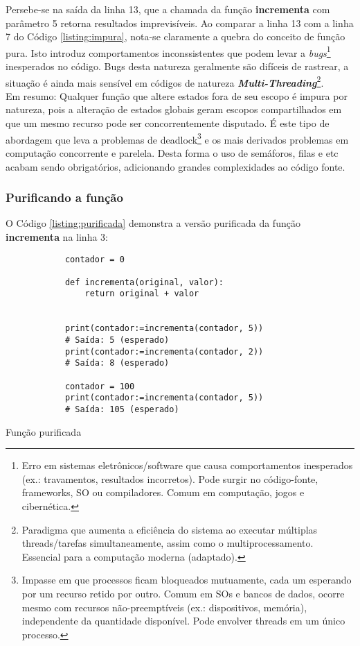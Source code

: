 \documentclass[date,twocolumn,a4paper]{ppgem}
\begin{document}
        Persebe-se na saída da linha 13, que a chamada da função \textbf{incrementa} com parâmetro 5 retorna resultados imprevisíveis. Ao comparar
        a linha 13 com a linha 7 do Código \ref{listing:impura}, nota-se claramente a quebra do conceito de função pura. Isto introduz comportamentos inconssistentes
        que podem levar a \textit{bugs}\footnote{
            Erro em sistemas eletrônicos/software que causa comportamentos inesperados (ex.: travamentos, resultados incorretos). Pode surgir no código-fonte, frameworks, SO ou compiladores. Comum em computação, jogos e cibernética\cite{wiki_bug}.
        } inesperados no código. Bugs desta natureza geralmente são difíceis de rastrear, a situação é ainda
        mais sensível em códigos de natureza \textit{\textbf{Multi-Threading}}\footnote{
            Paradigma que aumenta a eficiência do sistema ao executar múltiplas threads/tarefas simultaneamente, assim como o multiprocessamento. Essencial para a computação moderna\cite{wiki_multithreading} (adaptado).
        }.\\
        Em resumo: Qualquer função que altere estados fora de seu escopo é impura por natureza, pois a alteração de estados globais geram escopos compartilhados em que um mesmo recurso pode ser concorrentemente disputado.
        É este tipo de abordagem que leva a problemas de deadlock\footnote{
            Impasse em que processos ficam bloqueados mutuamente, cada um esperando por um recurso retido por outro. Comum em SOs e bancos de dados, ocorre mesmo com recursos não-preemptíveis (ex.: dispositivos, memória), independente da quantidade disponível. Pode envolver threads em um único processo\cite{wiki_deadlock}.
        } e os mais derivados problemas em computação concorrente e parelela. Desta forma o uso de semáforos, filas e etc acabam sendo obrigatórios, adicionando grandes complexidades ao código fonte.

    \subsubsection{Purificando a função}
    O Código \ref{listing:purificada} demonstra a versão purificada da função \textbf{incrementa} na linha 3:
    \begin{listing}[!ht]
        \begin{verbatim}
            contador = 0

            def incrementa(original, valor):
                return original + valor


            print(contador:=incrementa(contador, 5))
            # Saída: 5 (esperado)
            print(contador:=incrementa(contador, 2))
            # Saída: 8 (esperado)

            contador = 100
            print(contador:=incrementa(contador, 5))
            # Saída: 105 (esperado)
        \end{verbatim}
        \caption{Função purificada}
        \label{listing:purificada}
    \end{listing}\linebreak
\end{document}
